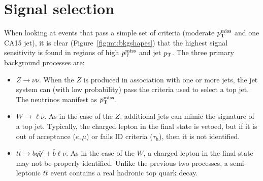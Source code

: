 \clearpage

\section{Signal selection}
\label{sec:mt:sel}

When looking at events that pass a simple set of criteria (moderate $p_\mathrm{T}^\mathrm{miss}$ and one CA15 jet), it is clear (Figure~\ref{fig:mt:bkgshapes}) that the highest signal sensitivity is found in regions of high $p_\mathrm{T}^\mathrm{miss}$ and jet $p_\mathrm{T}$.
The three primary background processes are:
\begin{itemize}
    \item $Z\rightarrow\nu\nu$. When the $Z$ is produced in association with one or more jets, the jet system can (with low probability) pass the criteria used to select a top jet. The neutrinos manifest as $p_\mathrm{T}^\mathrm{miss}$.
    \item $W\rightarrow\ell\nu$. As in the case of the $Z$, additional jets can mimic the signature of a top jet. Typically, the charged lepton in the final state is vetoed, but if it is out of acceptance ($e,\mu$) or fails ID criteria ($\tau_\mathrm{h}$), then it is not identified.
    \item $t\bar{t} \rightarrow bq\bar{q}' + \bar{b}\ell\nu$. As in the case of the $W$, a charged lepton in the final state may not be properly identified. Unlike the previous two processes, a semi-leptonic $t\bar{t}$ event contains a real hadronic top quark decay.
\end{itemize}

